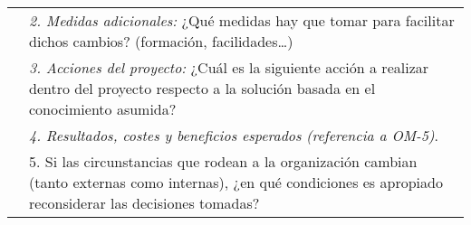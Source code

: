 \documentclass[12pt,a4paper,twoside,spanish]{article}      %
\begin{document}
\begin{table}[H]
\begin{tabularx}{\textwidth}{|p{4cm}|X|}
& \textit{2. Medidas adicionales:} ¿Qué medidas hay que tomar para facilitar dichos cambios? (formación,
facilidades\ldots)\\
& \textit{3. Acciones del proyecto:} ¿Cuál es la siguiente acción a realizar dentro del proyecto respecto a la
solución basada en el conocimiento asumida?\\
& \textit{4. Resultados, costes y beneficios esperados} \emph{(referencia a OM-5)}.\\
& 5. Si las circunstancias que rodean a la organización cambian (tanto externas como
internas), ¿en qué condiciones es apropiado reconsiderar las
decisiones tomadas? \\ \hline

\end{tabularx}
  \label{tab.OTA1}
\end{table}


\end{document}

